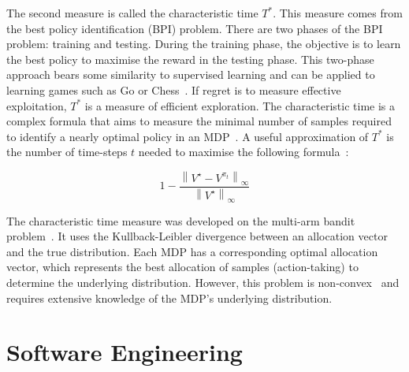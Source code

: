 \documentclass[]{final_report}
\begin{document}
\label{bpi-introduction}
The second measure is called the characteristic time $T^*$. This measure comes from the best policy identification (BPI) problem. There are two phases of the BPI problem: training and testing. During the training phase, the objective is to learn the best policy to maximise the reward in the testing phase. This two-phase approach bears some similarity to supervised learning and can be applied to learning games such as Go or Chess~\cite{bestPolicyIdentifaction}. If regret is to measure effective exploitation, $T^*$ is a measure of efficient exploration. The characteristic time is a complex formula that aims to measure the minimal number of samples required to identify a nearly optimal policy in an MDP~\cite{characteristicTime}. A useful approximation of $T^*$ is the number of time-steps $t$ needed to maximise the following formula~\cite{modelFree}:

\begin{equation}
  1- \frac{ \left\|V^\star-V^{\pi_t} \right\|_\infty}{\left\|V^\star\right\|_\infty}
  \label{eqn:characteristic-time-aproximation}
\end{equation}
 
The characteristic time measure was developed on the multi-arm bandit problem~\cite{characteristicTime}. It uses the Kullback-Leibler divergence between an allocation vector and the true distribution. Each MDP has a corresponding optimal allocation vector, which represents the best allocation of samples (action-taking) to determine the underlying distribution. However, this problem is non-convex~\cite{characteristicTimeNonConvex} and requires extensive knowledge of the MDP's underlying distribution.

\chapter{Software Engineering}
\end{document}
